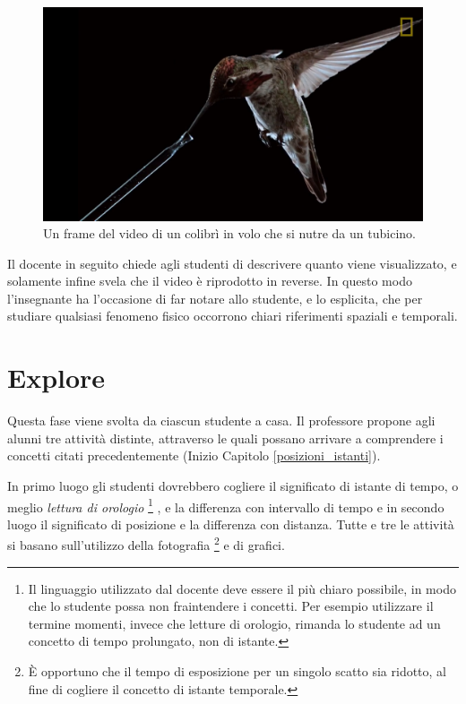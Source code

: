 \documentclass{report} \usepackage[T1]{fontenc} \usepackage[italian]{babel}
\begin{document}
\begin{figure}
\centering
  \includegraphics[width=\textwidth]{Hummingbird}
  \caption{Un frame del video di un colibrì in volo che si nutre da un tubicino.}
  \label{fig:hummingbird}
\end{figure}

Il docente in seguito chiede agli studenti di descrivere quanto viene
visualizzato, e solamente infine svela che il video è riprodotto in
reverse. In questo modo l'insegnante ha l'occasione di far notare
allo studente, e lo esplicita, che per studiare qualsiasi fenomeno fisico
occorrono chiari riferimenti spaziali e temporali.

\section{Explore}
Questa fase viene svolta da ciascun studente a casa. Il professore propone agli
alunni tre attività distinte, attraverso le quali possano arrivare a
comprendere i concetti citati precedentemente (Inizio Capitolo \ref{posizioni_istanti}).

In primo luogo gli
studenti dovrebbero cogliere il significato di istante di tempo, o meglio
\emph{lettura di orologio}\cite{arons1997teaching}
\footnote{
           Il linguaggio utilizzato dal docente deve essere il più chiaro possibile, in modo
           che lo studente possa non fraintendere i concetti. Per esempio utilizzare il
           termine momenti, invece che letture di orologio, rimanda lo studente ad un
           concetto di tempo prolungato, non di istante.
         }
, e la differenza con intervallo
di tempo e in secondo luogo il significato di posizione e la differenza con distanza.
Tutte e tre le attività si basano sull’utilizzo della fotografia
\footnote{
          \`E opportuno che il tempo di esposizione per un singolo scatto sia ridotto, al
            fine di cogliere il concetto di istante temporale.
         }
e di grafici.
\end{document}
